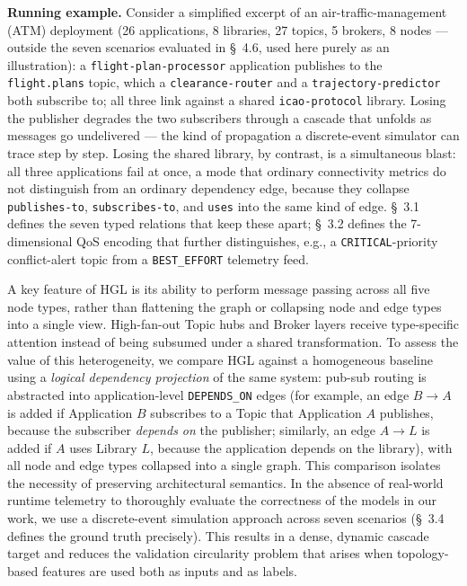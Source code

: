 \documentclass[review]{elsarticle}
\begin{document}
\textbf{Running example.} Consider a simplified excerpt of an air-traffic-management (ATM)
deployment (26 applications, 8 libraries, 27 topics, 5 brokers, 8 nodes --- outside the seven
scenarios evaluated in \S~4.6, used here purely as an illustration): a \texttt{flight-plan-processor}
application publishes to the \texttt{flight.plans} topic, which a \texttt{clearance-router} and a
\texttt{trajectory-predictor} both subscribe to; all three link against a shared
\texttt{icao-protocol} library. Losing the publisher degrades the two subscribers through a cascade
that unfolds as messages go undelivered --- the kind of propagation a discrete-event simulator can
trace step by step. Losing the shared library, by contrast, is a simultaneous blast: all three
applications fail at once, a mode that ordinary connectivity metrics do not distinguish from an
ordinary dependency edge, because they collapse \texttt{publishes-to}, \texttt{subscribes-to}, and
\texttt{uses} into the same kind of edge. \S~3.1 defines the seven typed relations that keep these
apart; \S~3.2 defines the 7-dimensional QoS encoding that further distinguishes, e.g., a
\texttt{CRITICAL}-priority conflict-alert topic from a \texttt{BEST\_EFFORT} telemetry feed.

A key feature of HGL is its ability to perform message passing across all five node types, rather
than flattening the graph or collapsing node and edge types into a single view. High-fan-out Topic
hubs and Broker layers receive type-specific attention instead of being subsumed under a shared
transformation. To assess the value of this heterogeneity, we compare HGL against a homogeneous
baseline using a \emph{logical dependency projection} of the same system: pub-sub routing is
abstracted into application-level \texttt{DEPENDS\_ON} edges (for example, an edge $B \to A$ is
added if Application $B$ subscribes to a Topic that Application $A$ publishes, because the
subscriber \emph{depends on} the publisher; similarly, an edge $A \to L$ is added if $A$ uses
Library $L$, because the application depends on the library), with all node and edge types
collapsed into a single graph. This comparison isolates the necessity of preserving architectural
semantics. In the absence of real-world runtime telemetry to thoroughly evaluate the correctness of
the models in our work, we use a discrete-event simulation approach across seven scenarios (\S~3.4
defines the ground truth precisely). This results in a dense, dynamic cascade target and reduces
the validation circularity problem that arises when topology-based features are used both as inputs
and as labels.
\end{document}
